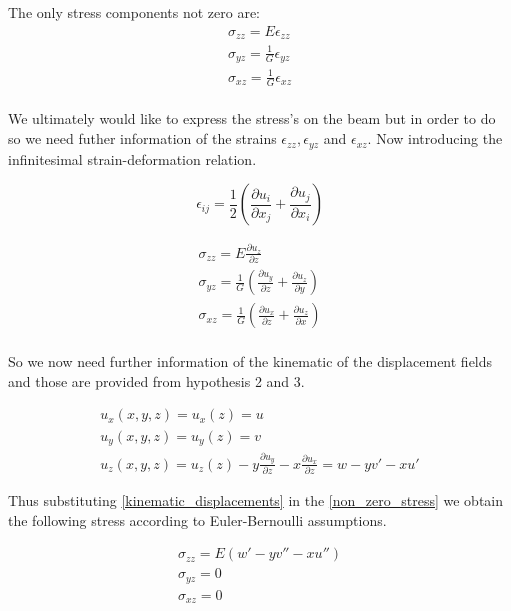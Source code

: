  The only stress components not zero are:
 \begin{equation}
 \begin{array}{c}
 \sigma_{zz}=E\epsilon_{zz}\\[1mm]
 \sigma_{yz}=\frac{1}{G}\epsilon_{yz}\\[1mm]
 \sigma_{xz}=\frac{1}{G}\epsilon_{xz}\\[1mm]
 \end{array}
 \label{non_zero_stress}
 \end{equation}

 We ultimately would like to express the stress's on the beam but in order to do so we need futher information of the strains $\epsilon_{zz}, \epsilon_{yz}$ and $\epsilon_{xz}$.
 Now introducing the infinitesimal strain-deformation relation.

 \begin{equation}
 \epsilon_{ij}=\frac{1}{2}(\frac{\partial u_{i}}{\partial x_{j}}+\frac{\partial u_{j}}{\partial x_{i}})
 \end{equation}

 \begin{equation}
 \begin{array}{c}
 \sigma_{zz}=E\frac{\partial u_{z}}{\partial z} \\[1mm]
 \sigma_{yz}=\frac{1}{G}(\frac{\partial u_{y}}{\partial z}+\frac{\partial u_{z}}{\partial y}) \\[1mm]
 \sigma_{xz}=\frac{1}{G}(\frac{\partial u_{x}}{\partial z}+\frac{\partial u_{z}}{\partial x}) \\[1mm]
 \end{array}
 \label{non_zero_stress}
 \end{equation}


 So we now need further information of the kinematic of the 
 displacement fields and those are provided from hypothesis  2 and 3.

 \begin{equation}
 \begin{array}{c}
 u_{x}(x,y,z)=u_{x}(z)=u\\[1mm]
 u_{y}(x,y,z)=u_{y}(z)=v\\[1mm]
 u_{z}(x,y,z)=u_{z}(z)-y\frac{\partial u_{y}}{\partial z}-x\frac{\partial u_{x}}{\partial z}=w -yv'-xu'
 \end{array}
 \label{kinematic_displacements}
 \end{equation}

 Thus substituting \ref{kinematic_displacements} in the \ref{non_zero_stress} we obtain the following stress according to Euler-Bernoulli assumptions.

 \begin{equation}
 \begin{array}{c}
 \sigma_{zz}=E(w'-yv''-xu'') \\[1mm]
 \sigma_{yz}=0 \\[1mm]
 \sigma_{xz}=0 \\[1mm]
 \end{array}
 \label{euler-bernoulli-stresss}
 \end{equation}


